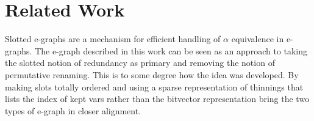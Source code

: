 \documentclass{article}%
\begin{document}











\section{Related Work}

Slotted e-graphs \cite{slotted} are a mechanism for efficient handling of $\alpha$ equivalence in e-graphs. The e-graph described in this work can be seen as an approach to taking the slotted notion of redundancy as primary and removing the notion of permutative renaming. This is to some degree how the idea was developed. By making slots totally ordered and using a sparse representation of thinnings that lists the index of kept vars rather than the bitvector representation bring the two types of e-graph in closer alignment.
\end{document}
